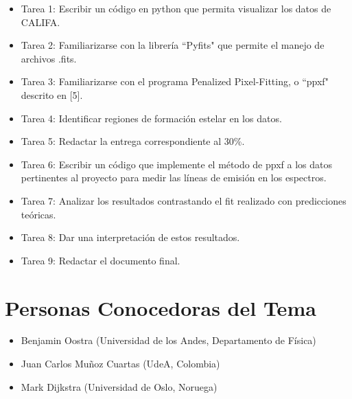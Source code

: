 \documentclass[12pt]{article}
\begin{document}
\begin{itemize}
    \item Tarea 1: Escribir un c\'odigo en python que permita visualizar los datos de CALIFA.
    \item Tarea 2: Familiarizarse con la librer\'ia ``Pyfits" que
      permite el manejo de archivos .fits.
    \item Tarea 3: Familiarizarse con el programa Penalized
      Pixel-Fitting, o ``ppxf" descrito en [5].
    \item Tarea 4: Identificar regiones de formaci\'on estelar en
      los datos.
    \item Tarea 5: Redactar la entrega correspondiente al 30\%.
    \item Tarea 6: Escribir un c\'odigo que implemente el m\'etodo de
      ppxf a los datos pertinentes al proyecto para medir las l\'ineas
      de emisi\'on en los espectros.
    \item Tarea 7: Analizar los resultados contrastando el fit
      realizado con predicciones te\'oricas.
    \item Tarea 8: Dar una interpretaci\'on de estos resultados.
    \item Tarea 9: Redactar el documento final.
\end{itemize}

\section{Personas Conocedoras del Tema}


\begin{itemize}
	\item Benjamin Oostra (Universidad de los Andes, Departamento de F\'isica)
	\item Juan Carlos Mu\~noz Cuartas (UdeA, Colombia)
	\item Mark Dijkstra (Universidad de Oslo, Noruega)
\end{itemize}
\end{document}
